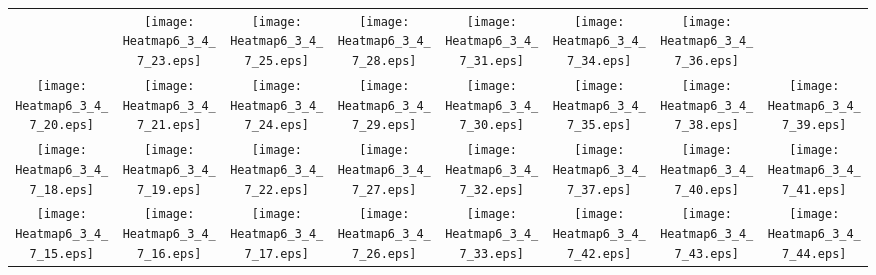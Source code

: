 \documentclass{standalone}
\begin{document}
\renewcommand{\arraystretch}{0}
\setlength{\tabcolsep}{0pt}
\begin{tabular}{ *8{c} }
 & \texttt{[image: Heatmap6\_3\_4\_7\_23.eps]} & \texttt{[image: Heatmap6\_3\_4\_7\_25.eps]} & \texttt{[image: Heatmap6\_3\_4\_7\_28.eps]} & \texttt{[image: Heatmap6\_3\_4\_7\_31.eps]} & \texttt{[image: Heatmap6\_3\_4\_7\_34.eps]} & \texttt{[image: Heatmap6\_3\_4\_7\_36.eps]} &  \\
\texttt{[image: Heatmap6\_3\_4\_7\_20.eps]} & \texttt{[image: Heatmap6\_3\_4\_7\_21.eps]} & \texttt{[image: Heatmap6\_3\_4\_7\_24.eps]} & \texttt{[image: Heatmap6\_3\_4\_7\_29.eps]} & \texttt{[image: Heatmap6\_3\_4\_7\_30.eps]} & \texttt{[image: Heatmap6\_3\_4\_7\_35.eps]} & \texttt{[image: Heatmap6\_3\_4\_7\_38.eps]} & \texttt{[image: Heatmap6\_3\_4\_7\_39.eps]} \\
\texttt{[image: Heatmap6\_3\_4\_7\_18.eps]} & \texttt{[image: Heatmap6\_3\_4\_7\_19.eps]} & \texttt{[image: Heatmap6\_3\_4\_7\_22.eps]} & \texttt{[image: Heatmap6\_3\_4\_7\_27.eps]} & \texttt{[image: Heatmap6\_3\_4\_7\_32.eps]} & \texttt{[image: Heatmap6\_3\_4\_7\_37.eps]} & \texttt{[image: Heatmap6\_3\_4\_7\_40.eps]} & \texttt{[image: Heatmap6\_3\_4\_7\_41.eps]} \\
\texttt{[image: Heatmap6\_3\_4\_7\_15.eps]} & \texttt{[image: Heatmap6\_3\_4\_7\_16.eps]} & \texttt{[image: Heatmap6\_3\_4\_7\_17.eps]} & \texttt{[image: Heatmap6\_3\_4\_7\_26.eps]} & \texttt{[image: Heatmap6\_3\_4\_7\_33.eps]} & \texttt{[image: Heatmap6\_3\_4\_7\_42.eps]} & \texttt{[image: Heatmap6\_3\_4\_7\_43.eps]} & \texttt{[image: Heatmap6\_3\_4\_7\_44.eps]} \\

\end{tabular}
\end{document}

